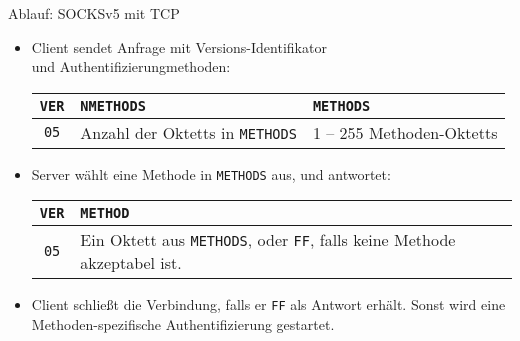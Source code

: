 \documentclass[t]{beamer}
\begin{document}
  \begin{frame}{Ablauf: SOCKSv5 mit TCP}
    \begin{itemize}
      \item
        Client sendet Anfrage mit Versions-Identifikator \\
        und Authentifizierungmethoden:
        \begin{adjustbox}{max width=\textwidth}

          \begin{tabular}{|c|p{4cm}|p{4cm}|}
            \hline
            \texttt{VER} & \texttt{NMETHODS}                      & \texttt{METHODS} \\
            \hline
            \texttt{05}  & Anzahl der Oktetts in \texttt{METHODS} & 1 – 255 Methoden-Oktetts \\
            \hline
          \end{tabular}
        \end{adjustbox}
      \item
        Server wählt eine Methode in \texttt{METHODS} aus, und antwortet:
        \begin{adjustbox}{max width=\textwidth}
          \begin{tabular}{|c|p{8cm}|}
            \hline
            \texttt{VER} & \texttt{METHOD} \\
            \hline
            \texttt{05}  & Ein Oktett aus \texttt{METHODS}, oder \texttt{FF}, falls keine Methode akzeptabel ist. \\
            \hline
          \end{tabular}
        \end{adjustbox}
      \item
        Client schließt die Verbindung, falls er \texttt{FF} als Antwort erhält.
        Sonst wird eine Methoden-spezifische Authentifizierung gestartet.
    \end{itemize}
  \end{frame}
\end{document}
